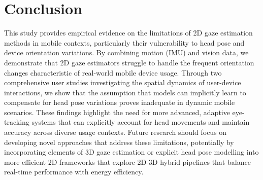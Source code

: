 \section{Conclusion}

This study provides empirical evidence on the limitations of 2D gaze estimation methods in mobile contexts, particularly their vulnerability to head pose and device orientation variations. By combining motion (IMU) and vision data, we demonstrate that 2D gaze estimators struggle to handle the frequent orientation changes characteristic of real-world mobile device usage. Through two comprehensive user studies investigating the spatial dynamics of user-device interactions, we show that the assumption that models can implicitly learn to compensate for head pose variations proves inadequate in dynamic mobile scenarios. These findings highlight the need for more advanced, adaptive eye-tracking systems that can explicitly account for head movements and maintain accuracy across diverse usage contexts.  Future research should focus on developing novel approaches that address these limitations, potentially by incorporating elements of 3D gaze estimation or explicit head pose modelling into more efficient 2D frameworks that explore 2D-3D hybrid pipelines that balance real-time performance with energy efficiency.